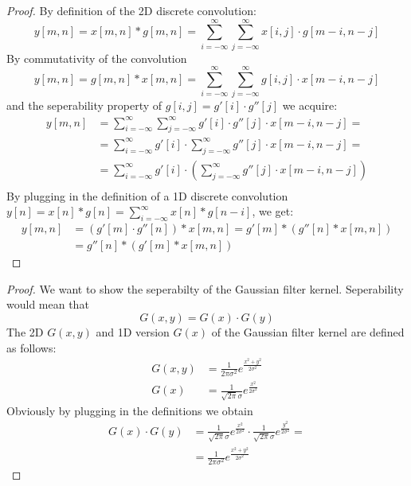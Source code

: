 \documentclass[journal]{IEEEtran}
\begin{document}
\newpage
\begin{appendix}
	\begin{proof}
		By definition of the 2D discrete convolution:
		\[
			y[m,n] = x[m,n]*g[m,n] = \sum \limits_{i=-\infty}^{\infty} \sum \limits_{j=-\infty}^{\infty} x[i, j]\cdot g[m-i, n -j]
		\]
		By commutativity of the convolution
		\[
			y[m,n] = g[m,n]* x[m,n]= \sum \limits_{i=-\infty}^{\infty} \sum \limits_{j=-\infty}^{\infty} g[i, j]\cdot x[m-i, n -j]
		\]
		and the seperability property of $g[i, j] = g'[i] \cdot g''[j]$ we acquire:
		\begin{align*}
			y[m,n] &=\sum \limits_{i=-\infty}^{\infty} \sum \limits_{j=-\infty}^{\infty} g'[i] \cdot g''[j] \cdot x[m-i, n -j] = \\
			&=\sum \limits_{i=-\infty}^{\infty} g'[i] \cdot \sum \limits_{j=-\infty}^{\infty}  g''[j] \cdot x[m-i, n -j] = \\
			&=\sum \limits_{i=-\infty}^{\infty} g'[i] \cdot \left(\sum \limits_{j=-\infty}^{\infty}  g''[j] \cdot x[m-i, n -j] \right) \\
		\end{align*}
		By plugging in the definition of a 1D discrete convolution $y[n] = x[n]*g[n] = \sum \limits_{i=-\infty}^{\infty} x[n]*g[n-i]$, we get:
		\begin{align*}
			y[m, n] &= (g'[m] \cdot g''[n])*x[m, n] = g'[m]*(g''[n]*x[m,n]) \\
			&=  g''[n]*(g'[m]*x[m,n])
		\end{align*}
	\end{proof}
	\begin{proof}
		We want to show the seperabilty of the Gaussian filter kernel. Seperability would mean that
		\[
		G(x,y) = G(x)\cdot G(y)
		\]
		The 2D $G(x,y)$ and 1D version $G(x)$  of the Gaussian filter kernel are defined as follows:
		\begin{align*}
			G(x,y) &= \frac{1}{2\pi \sigma^2}e^{\frac{x^2+y^2}{2\sigma^2}} \\
			G(x) &= \frac{1}{\sqrt{2\pi} \sigma}e^{\frac{x^2}{2\sigma^2}}
		\end{align*}
		Obviously by plugging in the definitions we obtain
		\begin{align*}
			G(x)\cdot G(y) &= \frac{1}{\sqrt{2\pi} \sigma}e^{\frac{x^2}{2\sigma^2}} \cdot \frac{1}{\sqrt{2\pi} \sigma}e^{\frac{y^2}{2\sigma^2}} = \\
			&= \frac{1}{2\pi \sigma^2}e^{\frac{x^2+y^2}{2\sigma^2}}
		\end{align*}


\end{proof}
\end{appendix}
\end{document}
